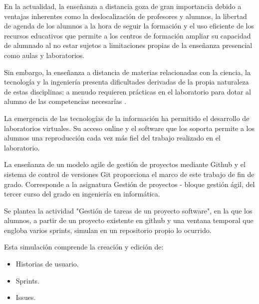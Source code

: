 
En la actualidad, la enseñanza a distancia goza de gran importancia debido a ventajas inherentes como la deslocalización de profesores y alumnos, la libertad de agenda de los alumnos a la hora de seguir la formación y el uso eficiente de los recursos educativos que permite a los centros de formación ampliar su capacidad de alumnado al no estar sujetos a limitaciones propias de la enseñanza presencial como aulas y laboratorios.

Sin embargo, la enseñanza a distancia de materias relacionadas con la ciencia, la tecnología y  la ingeniería  presenta dificultades derivadas de la propia naturaleza de estas disciplinas: a menudo requieren prácticas en el laboratorio para dotar al alumno de las competencias necesarías .

La emergencia de las tecnologías de la información ha permitido el desarrollo de laboratorios virtuales. Su acceso online y el software que los soporta permite a los alumnos una reproducción cada vez más fiel del trabajo realizado en el laboratorio.

La enseñanza de un modelo agile de gestión de proyectos mediante Github y el sistema de control de versiones Git proporciona el marco de este trabajo de fin de grado. Corresponde a la asignatura Gestión de proyectos - bloque gestión ágil, del tercer curso del grado en ingeniería en informática.

Se plantea la actividad "Gestión de tareas de un proyecto software", en la que los alumnos, a partir de un proyecto existente en github y una ventana temporal que engloba varios sprints, simulan en un repositorio propio lo ocurrido.

Esta simulación comprende la creación y edición de:

\begin{itemize}
	\item Historias de usuario.
	\item Sprints.
	\item Issues.
\end{itemize}



 